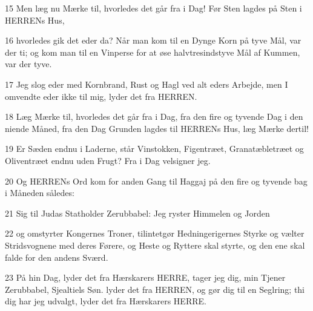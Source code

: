 \par 15 Men læg nu Mærke til, hvorledes det går fra i Dag! Før Sten lagdes på Sten i HERRENs Hus,
\par 16 hvorledes gik det eder da? Når man kom til en Dynge Korn på tyve Mål, var der ti; og kom man til en Vinperse for at øse halvtresindstyve Mål af Kummen, var der tyve.
\par 17 Jeg slog eder med Kornbrand, Rust og Hagl ved alt eders Arbejde, men I omvendte eder ikke til mig, lyder det fra HERREN.
\par 18 Læg Mærke til, hvorledes det går fra i Dag, fra den fire og tyvende Dag i den niende Måned, fra den Dag Grunden lagdes til HERRENs Hus, læg Mærke dertil!
\par 19 Er Sæden endnu i Laderne, står Vinstokken, Figentræet, Granatæbletræet og Oliventræet endnu uden Frugt? Fra i Dag velsigner jeg.
\par 20 Og HERRENs Ord kom for anden Gang til Haggaj på den fire og tyvende bag i Måneden således:
\par 21 Sig til Judas Statholder Zerubbabel: Jeg ryster Himmelen og Jorden
\par 22 og omstyrter Kongernes Troner, tilintetgør Hedningerigernes Styrke og vælter Stridsvognene med deres Førere, og Heste og Ryttere skal styrte, og den ene skal falde for den andens Sværd.
\par 23 På hin Dag, lyder det fra Hærskarers HERRE, tager jeg dig, min Tjener Zerubbabel, Sjealtiels Søn. lyder det fra HERREN, og gør dig til en Seglring; thi dig har jeg udvalgt, lyder det fra Hærskarers HERRE.


